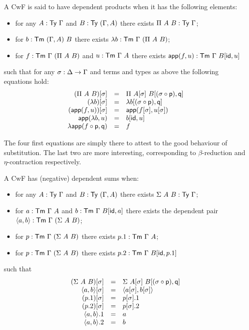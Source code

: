 A \acrshort{CwF} is said to have dependent products when it has the following
elements:
\begin{itemize}
  \item for any \(A : \mathsf{Ty}\ \Gamma\) and \(B : \mathsf{Ty}\ (\Gamma, A)\) there exists
  \(\Pi\ A\ B : \mathsf{Ty}\ \Gamma\);
  \item for \(b : \mathsf{Tm}\ (\Gamma, A)\ B\) there exists
  \(\lambda b : \CTm\ \Ga\ (\Pi\ A\ B)\);
  \item for \(f : \mathsf{Tm}\ \Gamma\ (\Pi\ A\ B)\) and \(u : \mathsf{Tm}\ \Gamma\ A\) there exists
  \(\mathsf{app}(f,u) : \mathsf{Tm}\ \Gamma\ B[\mathsf{id}, u]\)
\end{itemize}
such that for any \(\sigma : \Delta \to \Gamma\) and terms and types as above the
following equations hold:
\[
  \begin{array}{rcl}
    (\Pi\ A\ B)[\sigma] &=& \Pi\ A[\sigma]\ B[(\sigma \circ \mathsf{p}), \mathsf{q}] \\
    (\lambda b)[\sigma] &=& \lambda b[(\sigma \circ \mathsf{p}), \mathsf{q}] \\
    (\mathsf{app}(f,u))[\sigma] &=& \mathsf{app}(f[\sigma],u[\sigma]) \\
    \mathsf{app}(\lambda b, u) &=& b[\mathsf{id}, u] \\
    \lambda \mathsf{app}(f \circ \mathsf{p}, \mathsf{q}) &=& f
  \end{array}
\]

The four first equations are simply there to attest to the good behaviour of
substitution. The last two are more interesting, corresponding to
\(\beta\)-reduction and \(\eta\)-contraction respectively.


A \acrshort{CwF} has (negative) dependent sums
when:
\begin{itemize}
  \item for any \(A : \mathsf{Ty}\ \Gamma\) and \(B : \mathsf{Ty}\ (\Gamma, A)\) there exists
  \(\Sigma\ A\ B : \mathsf{Ty}\ \Gamma\);
  \item for \(a : \mathsf{Tm}\ \Gamma\ A\) and \(b : \mathsf{Tm}\ \Gamma\ B[\mathsf{id},a]\) there exists
  the dependent pair \(\dpair{a,b} : \CTm\ \Ga\ (\Sigma\ A\ B)\);
  \item for \(p : \CTm\ \Ga\ (\Sigma\ A\ B)\) there exists
  \(p.1 : \CTm\ \Ga\ A\);
  \item for \(p : \CTm\ \Ga\ (\Sigma\ A\ B)\) there exists
  \(p.2 : \CTm\ \Ga\ B[\cid, p.1]\)
\end{itemize}
such that
\[
  \begin{array}{rcl}
    (\Sigma\ A\ B)[\sigma] &=& \Sigma\ A[\sigma]\ B[(\sigma \circ \mathsf{p}), \mathsf{q}] \\
    \langle a,b \rangle[\sigma] &=& \langle a[\sigma], b[\sigma] \rangle \\
    (p.1)[\sigma] &=& p[\sigma].1 \\
    (p.2)[\sigma] &=& p[\sigma].2 \\
    \langle a,b \rangle.1 &=& a \\
    \langle a,b \rangle.2 &=& b
  \end{array}
\]

